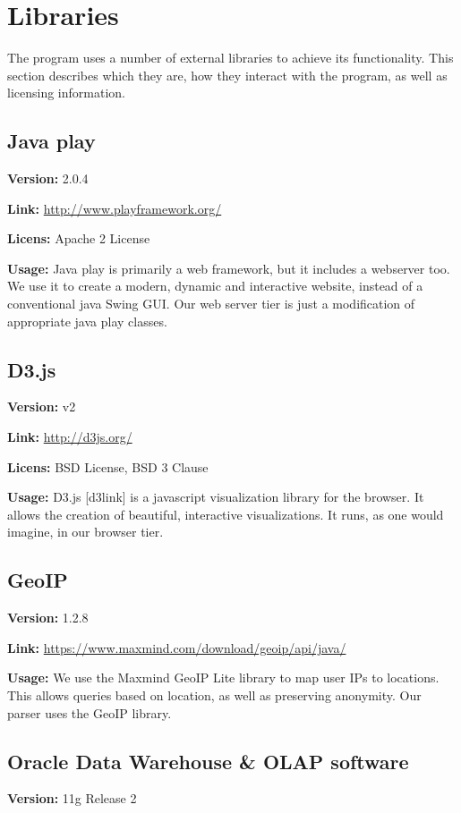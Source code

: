 \section{Libraries}


The program uses a number of external libraries to achieve its functionality. This section describes which they are,
how they interact with the program, as well as licensing information. 

\subsection{Java play}
\textbf{Version:} 2.0.4

\textbf{Link:} \url{http://www.playframework.org/}

\textbf{Licens:} Apache 2 License


\textbf{Usage:} 
Java play is primarily a web framework, but it includes a webserver too.
We use it to create a modern, dynamic and interactive website, instead of a conventional java Swing GUI.
Our web server tier is just a modification of appropriate java play classes.

\subsection{D3.js}
\textbf{Version:} v2

\textbf{Link:} \url{http://d3js.org/} 

\textbf{Licens:} BSD License, BSD 3 Clause


\textbf{Usage:} 
D3.js [d3link] is a javascript visualization library for the browser.
It allows the creation of beautiful, interactive visualizations.
It runs, as one would imagine, in our browser tier.




\subsection{GeoIP}\label{geo}

\textbf{Version:} 1.2.8

\textbf{Link:} \url{https://www.maxmind.com/download/geoip/api/java/}

\textbf{Usage:} 
We use the Maxmind GeoIP Lite library to map user IPs to locations.
This allows queries based on location, as well as preserving anonymity.
Our parser uses the GeoIP library.


\subsection{Oracle Data Warehouse & OLAP software}
\textbf{Version:} 11g Release 2


